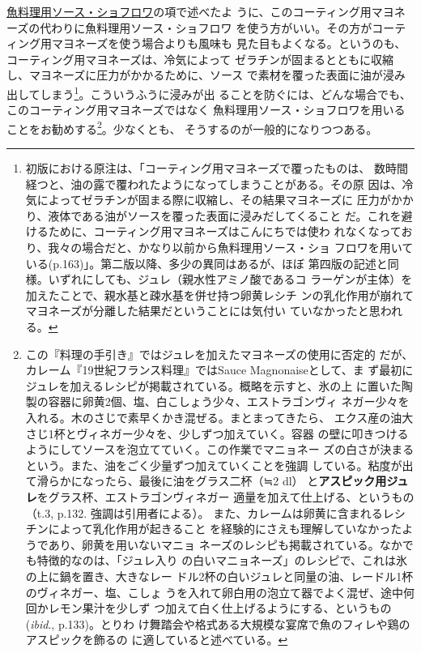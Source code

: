 \begin{recette}
\protect\hyperlink{sauce-chaud-froid-maigre}{魚料理用ソース・ショフロワ}の項で述べたよ
うに、このコーティング用マヨネーズの代わりに魚料理用ソース・ショフロワ
を使う方がいい。その方がコーティング用マヨネーズを使う場合よりも風味も
見た目もよくなる。というのも、コーティング用マヨネーズは、冷気によって
ゼラチンが固まるとともに収縮し、マヨネーズに圧力がかかるために、ソース
で素材を覆った表面に油が浸み出してしまう\footnote{初版における原注は、「コーティング用マヨネーズで覆ったものは、
  数時間経つと、油の露で覆われたようになってしまうことがある。その原
  因は、冷気によってゼラチンが固まる際に収縮し、その結果マヨネーズに
  圧力がかかり、液体である油がソースを覆った表面に浸みだしてくること
  だ。これを避けるために、コーティング用マヨネーズはこんにちでは使わ
  れなくなっており、我々の場合だと、かなり以前から魚料理用ソース・ショ
  フロワを用いている(p.163)」。第二版以降、多少の異同はあるが、ほぼ
  第四版の記述と同様。いずれにしても、ジュレ（親水性アミノ酸であるコ
  ラーゲンが主体）を加えたことで、親水基と疎水基を併せ持つ卵黄レシチ
  ンの乳化作用が崩れてマヨネーズが分離した結果だということには気付い
  ていなかったと思われる。}。こういうふうに浸みが出
ることを防ぐには、どんな場合でも、このコーティング用マヨネーズではなく
魚料理用ソース・ショフロワを用いることをお勧めする\footnote{この『料理の手引き』ではジュレを加えたマヨネーズの使用に否定的
  だが、カレーム『19世紀フランス料理』ではSauce Magnonaiseとして、ま
  ず最初にジュレを加えるレシピが掲載されている。概略を示すと、氷の上
  に置いた陶製の容器に卵黄2個、塩、白こしょう少々、エストラゴンヴィ
  ネガー少々を入れる。木のさじで素早くかき混ぜる。まとまってきたら、
  エクス産の油大さじ1杯とヴィネガー少々を、少しずつ加えていく。容器
  の壁に叩きつけるようにしてソースを泡立てていく。この作業でマニョネー
  ズの白さが決まるという。また、油をごく少量ずつ加えていくことを強調
  している。粘度が出て滑らかになったら、最後に油をグラス二杯（≒2 dl）
  と\textbf{アスピック用ジュレ}をグラス\undemi{}杯、エストラゴンヴィネガー
  適量を加えて仕上げる、というもの（t.3, p.132. 強調は引用者による）。
  また、カレームは卵黄に含まれるレシチンによって乳化作用が起きること
  を経験的にさえも理解していなかったようであり、卵黄を用いないマニョ
  ネーズのレシピも掲載されている。なかでも特徴的なのは、「ジュレ入り
  の白いマニョネーズ」のレシピで、これは氷の上に鍋を置き、大きなレー
  ドル2杯の白いジュレと同量の油、レードル1杯のヴィネガー、塩、こしょ
  うを入れて卵白用の泡立て器でよく混ぜ、途中何回かレモン果汁を少しず
  つ加えて白く仕上げるようにする、というもの(\emph{ibid}.,
  p.133)。とりわ
  け舞踏会や格式ある大規模な宴席で魚のフィレや鶏のアスピックを飾るの
  に適していると述べている。}。少なくとも、
そうするのが一般的になりつつある。


\end{recette}
